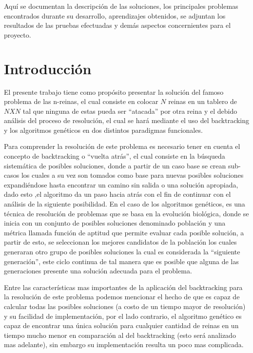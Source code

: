 \documentclass[12pt,a4paper]{article}
\begin{document}
 	Aquí se documentan la descripción de las soluciones, los principales problemas encontrados durante su desarrollo, aprendizajes obtenidos, se adjuntan los resultados de las pruebas efectuadas y demás aspectos concernientes para el proyecto.
 	
\pagebreak
\section{Introducción}

	El presente trabajo tiene como propósito presentar la solución del famoso problema de las n-reinas, el cual consiste en colocar $N $ reinas en un tablero de $NXN $ tal que ninguna de estas pueda ser “atacada” por otra reina y el debido análisis del proceso de resolución, el cual se hará mediante el uso del backtracking y los algoritmos genéticos en dos distintos paradigmas funcionales.

	Para comprender la resolución de este problema es necesario tener en cuenta el concepto de backtracking o “vuelta atrás”, el cual consiste en la búsqueda sistemática de posibles soluciones, donde a partir de un caso base se crean sub-casos  los cuales a su vez son tomados como base para nuevas posibles soluciones expandiéndose hasta encontrar un camino sin salida o una solución apropiada, dado esto ,el algoritmo da un paso hacia atrás con el fin de continuar con el análisis de la siguiente posibilidad. En el caso de los algoritmos genéticos, es una técnica de resolución de problemas que se basa en la evolución biológica, donde se inicia con un conjunto de posibles soluciones denominado población y una métrica llamada función de aptitud que permite evaluar cada posible solución, a partir de esto, se seleccionan los mejores candidatos de la población los cuales generaran otro grupo de posibles soluciones la cual es considerada la “siguiente generación”, este ciclo continua de tal manera que es posible que alguna de las generaciones presente una solución adecuada para el problema.  

	Entre las características mas importantes de la aplicación del backtracking para la resolución de este problema podemos mencionar el hecho de que es capaz de calcular todas las posibles soluciones (a costo de un tiempo mayor de resolución) y su facilidad de implementación, por el lado contrario, el algoritmo genético es capaz de encontrar una única solución  para cualquier cantidad de reinas en un tiempo mucho menor en comparación al del backtracking (esto será analizado mas adelante), sin embargo su implementación resulta un poco mas complicada.
\bigskip
\bigskip 
\end{document}

